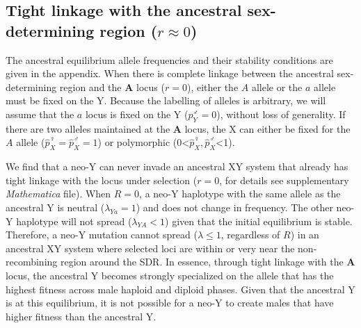 \documentclass[10pt,letterpaper]{article}
\begin{document}
\subsection*{Tight linkage with the ancestral sex-determining region ($r \approx 0$)}

The ancestral equilibrium allele frequencies and their stability conditions are given in the appendix.
When there is complete linkage between the ancestral sex-determining region and the \textbf{A} locus ($r=0$), either the $A$ allele or the $a$ allele must be fixed on the Y. 
Because the labelling of alleles is arbitrary, we will assume that the $a$ locus is fixed on the Y ($p^\male_Y=0$), without loss of generality. 
If there are two alleles maintained at the \textbf{A} locus, the X can either be fixed for the $A$ allele ($\hat{p}^\female_X=\hat{p}^\male_X=1$) or polymorphic (0<$\hat{p}^\female_X, \hat{p}^\male_X$<1). 

We find that a neo-Y can never invade an ancestral XY system that already has tight linkage with the locus under selection ($r=0$, for details see supplementary \textit{Mathematica} file). 
When $R=0$, a neo-Y haplotype with the same allele as the ancestral Y is neutral ($\lambda_{Ya}=1$) and does not change in frequency.
The other neo-Y haplotype will not spread ($\lambda_{YA}<1$) given that the initial equilibrium is stable. 
Therefore, a neo-Y mutation cannot spread ($\lambda \leq 1$, regardless of $R$) in an ancestral XY system where selected loci are within or very near the non-recombining region around the SDR.
In essence, through tight linkage with the \textbf{A} locus, the ancestral Y becomes strongly specialized on the allele that has the highest fitness across male haploid and diploid phases. 
Given that the ancestral Y is at this equilibrium, it is not possible for a neo-Y to create males that have higher fitness than the ancestral Y. 
\end{document}
